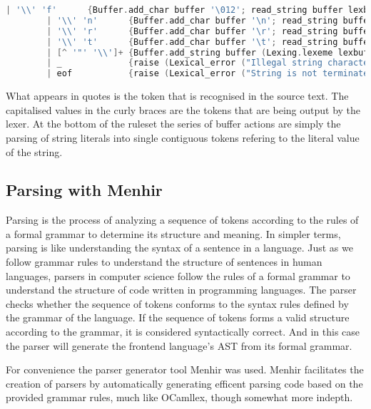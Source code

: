 \documentclass{l4proj}
\begin{document}
\begin{lstlisting}[language=C, caption=PyFunc's lexer specification for OCamllex., keepspaces=true]
        | '\\' 'f'      {Buffer.add_char buffer '\012'; read_string buffer lexbuf}
        | '\\' 'n'      {Buffer.add_char buffer '\n'; read_string buffer lexbuf}
        | '\\' 'r'      {Buffer.add_char buffer '\r'; read_string buffer lexbuf}
        | '\\' 't'      {Buffer.add_char buffer '\t'; read_string buffer lexbuf}
        | [^ '"' '\\']+ {Buffer.add_string buffer (Lexing.lexeme lexbuf);read_string buffer lexbuf}
        | _             {raise (Lexical_error ("Illegal string character: " ^ Lexing.lexeme lexbuf))}
        | eof           {raise (Lexical_error ("String is not terminated"))}
\end{lstlisting}

What appears in quotes is the token that is recognised in the source text.
The capitalised values in the curly braces are the tokens that are being output by the lexer.
At the bottom of the ruleset the series of buffer actions are simply the parsing of string literals into single contiguous tokens refering to the literal value of the string.

\subsection{Parsing with Menhir}

Parsing is the process of analyzing a sequence of tokens according to the rules of a formal grammar to determine its structure and meaning.
In simpler terms, parsing is like understanding the syntax of a sentence in a language.
Just as we follow grammar rules to understand the structure of sentences in human languages, parsers in computer science follow the rules of a formal grammar to understand the structure of code written in programming languages.
The parser checks whether the sequence of tokens conforms to the syntax rules defined by the grammar of the language.
If the sequence of tokens forms a valid structure according to the grammar, it is considered syntactically correct.
And in this case the parser will generate the frontend language's AST from its formal grammar.

For convenience the parser generator tool Menhir was used.
Menhir facilitates the creation of parsers by automatically generating efficent parsing code based on the provided grammar rules, much like OCamllex, though somewhat more indepth.
\end{document}
